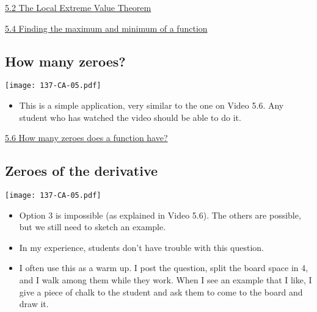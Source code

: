 \documentclass[11pt]{article}
\newcommand{\nl}{\hfill \vspace{-1.1\baselineskip}} %
\newcommand{\vii}{\hspace{8mm} \href{https://www.youtube.com/watch?v=_z8OglXFIq8&list=PLlwePzQY_wW9m5oabUf6hvfVfAaA9uAwM&index=2}{5.2 The Local Extreme Value Theorem}}
\newcommand{\viv}{\hspace{8mm} \href{https://www.youtube.com/watch?v=_giwkVIFeGY&list=PLlwePzQY_wW9m5oabUf6hvfVfAaA9uAwM&index=4}{5.4 Finding the maximum and minimum of a function}}
\newcommand{\vvi}{\hspace{8mm} \href{https://www.youtube.com/watch?v=5TKUOC06JzM&list=PLlwePzQY_wW9m5oabUf6hvfVfAaA9uAwM&index=6}{5.6 How many zeroes does a function have?}}
\begin{document}
\begin{videos}
\vii

\viv
\end{videos}

\newpage
\subsection{How many zeroes?}

\begin{center}
{ \texttt{[image: 137-CA-05.pdf]}} 
\end{center}


\begin{comments}
\nl
\begin{itemize}
\item This is a simple application, very similar to the one on Video 5.6.  Any student who has watched the video should be able to do it.
\end{itemize}	
\end{comments}

\begin{videos}
\vvi
\end{videos}

\newpage
\subsection{Zeroes of the derivative}

\begin{center}
{ \texttt{[image: 137-CA-05.pdf]}} 
\end{center}


\begin{comments}
\nl
\begin{itemize}
\item  Option 3 is impossible (as explained in Video 5.6).  The others are possible, but we still need to sketch an example.

\item In my experience, students don't have trouble with this question.

\item I often use this as a warm up.  I post the question, split the board space in 4, and I walk among them while they work.  When I see an example that I like, I give a piece of chalk to the student and ask them to come to the board and draw it.
\end{itemize}	
\end{comments}
\end{document}
